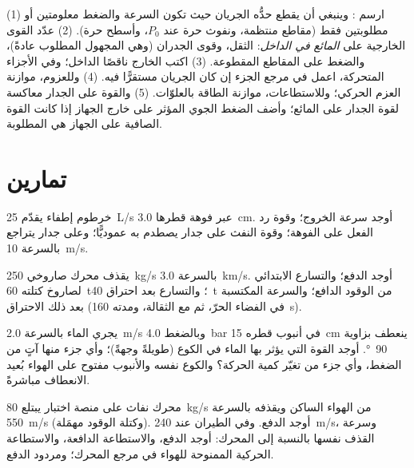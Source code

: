 \begin{method}\label{met:b2:flow-balances:method}
(1) ارسم : وينبغي أن يقطع حدُّه الجريان حيث تكون
السرعة والضغط معلومتين أو مطلوبتين فقط (مقاطع منتظمة،
ونفوث حرة عند $P_0$، وأسطح حرة). (2) عدّد القوى الخارجية على
\emph{المائع في الداخل}: الثقل، وقوى الجدران (وهي المجهول
المطلوب عادةً)، والضغط على المقاطع المقطوعة. (3) اكتب  الخارج ناقصًا الداخل؛ وفي الأجزاء المتحركة، اعمل في مرجع
الجزء إن كان الجريان مستقرًّا فيه. (4) وللعزوم، موازنة العزم
الحركي؛ وللاستطاعات، موازنة الطاقة بالعلوّات. (5) والقوة على
الجدار معاكسة لقوة الجدار على المائع؛ وأضف الضغط الجوي المؤثر
على خارج الجهاز إذا كانت القوة الصافية على الجهاز هي المطلوبة.
\end{method}

\section{تمارين}

\begin{exercise}[$\star$]\label{exo:b2:flow-balances:1}
خرطوم إطفاء يقدّم \qty{25}{L/s} عبر فوهة قطرها \qty{3.0}{cm}.
أوجد سرعة الخروج؛ وقوة رد الفعل على الفوهة؛ وقوة النفث
على جدار يصطدم به عموديًّا؛ وعلى جدار يتراجع بالسرعة \qty{10}{m/s}.
\end{exercise}

\begin{exercise}[$\star$]\label{exo:b2:flow-balances:2}
يقذف محرك صاروخي \qty{250}{kg/s} بالسرعة \qty{3.0}{km/s}. أوجد الدفع؛
والتسارع الابتدائي لصاروخ كتلته \qty{60}{t}؛ والتسارع بعد احتراق
\qty{40}{t} من الوقود الدافع؛ والسرعة المكتسبة بعد ذلك الاحتراق
(في الفضاء الحرّ، ثم مع الثقالة، ومدته \qty{160}{s}).
\end{exercise}

\begin{exercise}[$\star$]\label{exo:b2:flow-balances:3}
يجري الماء بالسرعة \qty{2.0}{m/s} وبالضغط \qty{4.0}{bar} في أنبوب قطره \qty{15}{cm}
ينعطف بزاوية \qty{90}{\degree}. أوجد القوة التي يؤثر بها الماء في الكوع
(طويلةً وجهةً)؛ وأي جزء منها آتٍ من الضغط، وأي جزء
من تغيّر كمية الحركة؟ والكوع نفسه والأنبوب مفتوح على الهواء بُعيد
الانعطاف مباشرةً.
\end{exercise}

\begin{exercise}[$\star$]\label{exo:b2:flow-balances:4}
محرك نفاث على منصة اختبار يبتلع \qty{80}{kg/s} من الهواء الساكن
ويقذفه بالسرعة \qty{550}{m/s} (وكتلة الوقود مهمَلة). أوجد الدفع. وفي الطيران
عند \qty{240}{m/s}، وسرعة القذف نفسها بالنسبة إلى المحرك: أوجد الدفع،
والاستطاعة الدافعة، والاستطاعة الحركية الممنوحة للهواء في مرجع
المحرك؛ ومردود الدفع.
\end{exercise}

